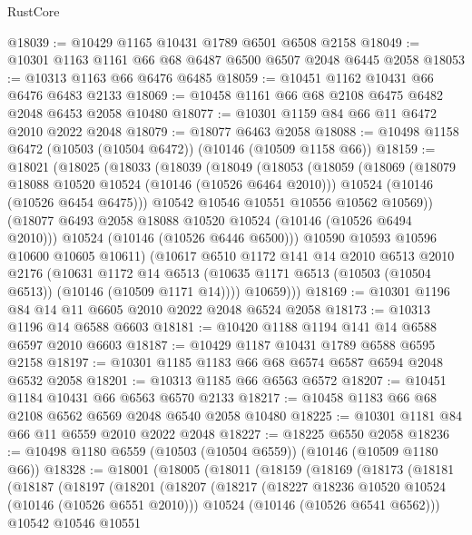 \begin{lexlean}{RustCore}
\begin{coremodule}
@18039 := @10429 @1165 @10431 @1789 @6501 @6508 @2158
@18049 := @10301 @1163 @1161 @66 @68 @6487 @6500 @6507 @2048 @6445 @2058
@18053 := @10313 @1163 @66 @6476 @6485
@18059 := @10451 @1162 @10431 @66 @6476 @6483 @2133
@18069 := @10458 @1161 @66 @68 @2108 @6475 @6482 @2048 @6453 @2058 @10480
@18077 := @10301 @1159 @84 @66 @11 @6472 @2010 @2022 @2048
@18079 := @18077 @6463 @2058
@18088 := @10498 @1158 @6472 (@10503 (@10504 @6472)) (@10146 (@10509 @1158 @66))
@18159 := @18021
    (@18025
      (@18033
        (@18039
          (@18049
            (@18053
              (@18059
                (@18069
                  (@18079 @18088 @10520 @10524 (@10146 (@10526 @6464 @2010)))
                  @10524
                  (@10146 (@10526 @6454 @6475)))
                @10542
                @10546
                @10551
                @10556
                @10562
                @10569))
            (@18077 @6493 @2058 @18088 @10520 @10524 (@10146 (@10526 @6494 @2010)))
            @10524
            (@10146 (@10526 @6446 @6500)))
          @10590
          @10593
          @10596
          @10600
          @10605
          @10611)
        (@10617
          @6510
          @1172
          @141
          @14
          @2010
          @6513
          @2010
          @2176
          (@10631
            @1172
            @14
            @6513
            (@10635 @1171 @6513 (@10503 (@10504 @6513)) (@10146 (@10509 @1171 @14))))
          @10659)))
@18169 := @10301 @1196 @84 @14 @11 @6605 @2010 @2022 @2048 @6524 @2058
@18173 := @10313 @1196 @14 @6588 @6603
@18181 := @10420 @1188 @1194 @141 @14 @6588 @6597 @2010 @6603
@18187 := @10429 @1187 @10431 @1789 @6588 @6595 @2158
@18197 := @10301 @1185 @1183 @66 @68 @6574 @6587 @6594 @2048 @6532 @2058
@18201 := @10313 @1185 @66 @6563 @6572
@18207 := @10451 @1184 @10431 @66 @6563 @6570 @2133
@18217 := @10458 @1183 @66 @68 @2108 @6562 @6569 @2048 @6540 @2058 @10480
@18225 := @10301 @1181 @84 @66 @11 @6559 @2010 @2022 @2048
@18227 := @18225 @6550 @2058
@18236 := @10498 @1180 @6559 (@10503 (@10504 @6559)) (@10146 (@10509 @1180 @66))
@18328 := @18001
    (@18005
      (@18011
        (@18159
          (@18169
            (@18173
              (@18181
                (@18187
                  (@18197
                    (@18201
                      (@18207
                        (@18217
                          (@18227 @18236 @10520 @10524 (@10146 (@10526 @6551 @2010)))
                          @10524
                          (@10146 (@10526 @6541 @6562)))
                        @10542
                        @10546
                        @10551

\end{coremodule}
\end{lexlean}
